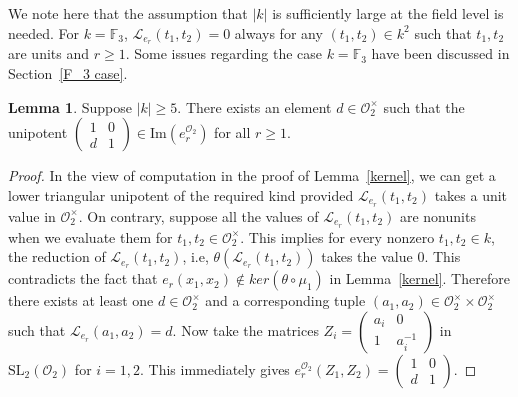 \documentclass[10pt,twoside]{amsart}
\newcommand{\SL}{\mathrm{SL}}
\newcommand{\im}{\mathrm{Im}}
\newcommand{\R}{\mathcal{O}_2}
\theoremstyle{definition}
\theoremstyle{definition}
\newtheorem{lemma}[theorem]{Lemma}
\begin{document}
We note here that the assumption that $|k|$ is sufficiently large at the field level is needed. For $k=\mathbb{F}_3$, $\mathcal{L}_{e_r}(t_1, t_2) = 0$ always for any $(t_1, t_2)\in k^2$ such that $t_1, t_2$ are units and $r\geq 1$. Some issues regarding the case $k = \mathbb{F}_3$ have been discussed in Section~\ref{F_3 case}.

\begin{lemma}{\label{uni2}}
Suppose $|k|\geq 5$. There exists an element $d\in \R^{\times}$ such that the unipotent $\left(\begin{array}{cc} 1  & 0 \\ d & 1 \end{array}\right)\in \im(e_r^{\R})$ for all $r\geq 1$.
\end{lemma}
\begin{proof}
In the view of computation in the proof of Lemma~\ref{kernel}, we can get a lower triangular unipotent of the required kind provided $\mathcal{L}_{e_r}(t_1,t_2)$ takes a unit value in $\R^{\times}$. On contrary, suppose all the values of $\mathcal{L}_{e_r}(t_1, t_2)$ are nonunits when we evaluate them for $t_1, t_2 \in \R^{\times}$. This implies for every nonzero $t_1, t_2\in k$, the reduction of $\mathcal{L}_{e_r}(t_1, t_2)$, i.e, $\theta(\mathcal{L}_{e_r}(t_1, t_2))$ takes the value $0$. This contradicts the fact that $e_r(x_1, x_2) \notin ker(\theta \circ \mu_1)$ in Lemma~\ref{kernel}. Therefore there exists at least one $d\in \R^{\times}$ and a corresponding tuple $(a_1, a_2)\in \R^{\times} \times \R^{\times}$ such that $\mathcal{L}_{e_r}(a_1, a_2) = d$. Now take the matrices $Z_i=\left(\begin{array}{cc} a_i  & 0 \\
1  & a_i^{-1} \end{array}\right)$ in $\SL_2(\R)$ for $i=1, 2$. This immediately gives $e_r^{\R}(Z_1, Z_2) = \left(\begin{array}{cc} 1  & 0 \\ d & 1 \end{array}\right)$.
\end{proof}
\end{document}
